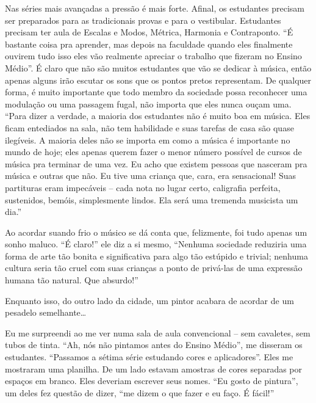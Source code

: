 \documentclass[a4paper,oneside,12pt,notitlepage]{article}
\begin{document}
Nas séries mais avançadas a pressão é mais forte.
Afinal, os estudantes precisam ser preparados para as tradicionais provas e para o vestibular.
Estudantes precisam ter aula de Escalas e Modos, Métrica, Harmonia e Contraponto.
``É bastante coisa pra aprender, mas depois na faculdade quando eles finalmente ouvirem tudo isso eles vão realmente apreciar o trabalho que fizeram no Ensino Médio''.
É claro que não são muitos estudantes que vão se dedicar à música, então apenas alguns irão escutar os sons que os pontos pretos representam.
De qualquer forma, é muito importante que todo membro da sociedade possa reconhecer uma modulação ou uma passagem fugal, não importa que eles nunca ouçam uma.
``Para dizer a verdade, a maioria dos estudantes não é muito boa em música.
Eles ficam entediados na sala, não tem habilidade e suas tarefas de casa são quase ilegíveis.
A maioria deles não se importa em como a música é importante no mundo de hoje;
eles apenas querem fazer o menor número possível de cursos de música pra terminar de uma vez.
Eu acho que existem pessoas que nasceram pra música e outras que não.
Eu tive uma criança que, cara, era sensacional!
Suas partituras eram impecáveis -- cada nota no lugar certo, caligrafia perfeita, sustenidos, bemóis, simplesmente lindos.
Ela será uma tremenda musicista um dia.''

Ao acordar suando frio o músico se dá conta que, felizmente, foi tudo apenas um sonho maluco.
``É claro!'' ele diz a si mesmo,
``Nenhuma sociedade reduziria uma forma de arte tão bonita e significativa para algo tão estúpido e trivial;
nenhuma cultura seria tão cruel com suas crianças a ponto de privá-las de uma expressão humana tão natural.
Que absurdo!''

Enquanto isso, do outro lado da cidade, um pintor acabara de acordar de um pesadelo semelhante\ldots

\vspace{1em}

Eu me surpreendi ao me ver numa sala de aula convencional -- sem cavaletes, sem tubos de tinta.
``Ah, nós não pintamos antes do Ensino Médio'',
me disseram os estudantes.
``Passamos a sétima série estudando cores e aplicadores''.
Eles me mostraram uma planilha.
De um lado estavam amostras de cores separadas por espaços em branco.
Eles deveriam escrever seus nomes.
``Eu gosto de pintura'',
um deles fez questão de dizer,
``me dizem o que fazer e eu faço. É fácil!''
\end{document}
